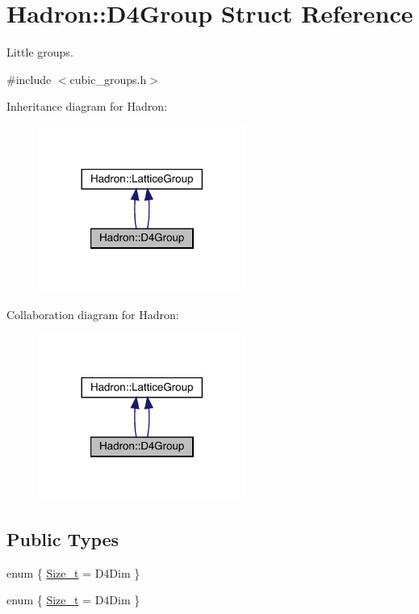 \hypertarget{structHadron_1_1D4Group}{}\section{Hadron\+:\+:D4\+Group Struct Reference}
\label{structHadron_1_1D4Group}


Little groups.  




{\ttfamily \#include $<$cubic\+\_\+groups.\+h$>$}



Inheritance diagram for Hadron\+:\nopagebreak
\begin{figure}[H]
\begin{center}
\leavevmode
\includegraphics[width=192pt]{d6/d37/structHadron_1_1D4Group__inherit__graph}
\end{center}
\end{figure}


Collaboration diagram for Hadron\+:\nopagebreak
\begin{figure}[H]
\begin{center}
\leavevmode
\includegraphics[width=192pt]{dc/d1e/structHadron_1_1D4Group__coll__graph}
\end{center}
\end{figure}
\subsection*{Public Types}
\begin{DoxyCompactItemize}
\item 
enum \{ \mbox{\hyperlink{structHadron_1_1D4Group_aebe422f0af477b78dbc12ed155d4f079ae076685e366303af9dfb0c9b88184abd}{Size\+\_\+t}} = D4\+Dim
 \}
\item 
enum \{ \mbox{\hyperlink{structHadron_1_1D4Group_aebe422f0af477b78dbc12ed155d4f079ae076685e366303af9dfb0c9b88184abd}{Size\+\_\+t}} = D4\+Dim
 \}
\end{DoxyCompactItemize}
